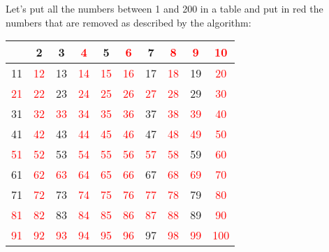 \begin{solution}
    Let's put all the numbers between 1 and 200 in a table and put in red the numbers that are removed as described by the algorithm:
    \begin{center}
        \begin{tabular}{ |c|c|c|c|c|c|c|c|c|c| } 
        \hline
         & 2 & 3 & \textcolor{red}{4} & 5 & \textcolor{red}{6} & 7 & \textcolor{red}{8} & \textcolor{red}{9} & \textcolor{red}{10} \\ 
        \hline
        11 & \textcolor{red}{12} & 13 & \textcolor{red}{14} & \textcolor{red}{15} & \textcolor{red}{16} & 17 & \textcolor{red}{18} & 19 & \textcolor{red}{20} \\ 
        \hline
        \textcolor{red}{21} & \textcolor{red}{22} & 23 & \textcolor{red}{24} & \textcolor{red}{25} & \textcolor{red}{26} & \textcolor{red}{27} & \textcolor{red}{28} & 29 & \textcolor{red}{30} \\ 
        \hline
        31 & \textcolor{red}{32} & \textcolor{red}{33} & \textcolor{red}{34} & \textcolor{red}{35} & \textcolor{red}{36} & 37 & \textcolor{red}{38} & \textcolor{red}{39} & \textcolor{red}{40} \\ 
        \hline
        41 & \textcolor{red}{42} & 43 & \textcolor{red}{44} & \textcolor{red}{45} & \textcolor{red}{46} & 47 & \textcolor{red}{48} & \textcolor{red}{49} & \textcolor{red}{50} \\ 
        \hline
        \textcolor{red}{51} & \textcolor{red}{52} & 53 & \textcolor{red}{54} & \textcolor{red}{55} & \textcolor{red}{56} & \textcolor{red}{57} & \textcolor{red}{58} & 59 & \textcolor{red}{60} \\ 
        \hline
        61 & \textcolor{red}{62} & \textcolor{red}{63} & \textcolor{red}{64} & \textcolor{red}{65} & \textcolor{red}{66} & 67 & \textcolor{red}{68} & \textcolor{red}{69} & \textcolor{red}{70} \\ 
        \hline
        71 & \textcolor{red}{72} & 73 & \textcolor{red}{74} & \textcolor{red}{75} & \textcolor{red}{76} & \textcolor{red}{77} & \textcolor{red}{78} & 79 & \textcolor{red}{80} \\
        \hline
        \textcolor{red}{81} & \textcolor{red}{82} & 83 & \textcolor{red}{84} & \textcolor{red}{85} & \textcolor{red}{86} & \textcolor{red}{87} & \textcolor{red}{88} & 89 & \textcolor{red}{90} \\ 
        \hline
        \textcolor{red}{91} & \textcolor{red}{92} & \textcolor{red}{93} & \textcolor{red}{94} & \textcolor{red}{95} & \textcolor{red}{96} & 97 & \textcolor{red}{98} & \textcolor{red}{99} & \textcolor{red}{100} \\ 

\end{tabular}
\end{center}
\end{solution}
